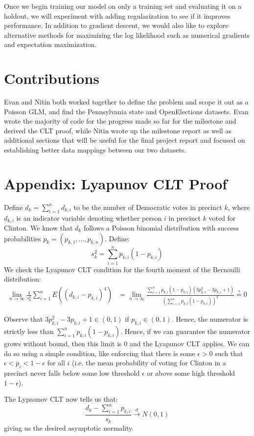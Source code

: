 \documentclass[10pt, letterpaper]{article}
\begin{document}
Once we begin training our model on only a training set and evaluating it on a holdout, we will experiment with adding regularization to see if it improves performance. In addition to gradient descent, we would also like to explore alternative methods for maximizing the log likelihood such as numerical gradients and expectation maximization.

\section{Contributions}
Evan and Nitin both worked together to define the problem and scope it out as a Poisson GLM, and find the Pennsylvania state and OpenElections datasets. Evan wrote the majority of code for the progress made so far for the milestone and derived the CLT proof, while Nitin wrote up the milestone report as well as additional sections that will be useful for the final project report and focused on establishing better data mappings between our two datasets.


\newpage
\section*{Appendix: Lyapunov CLT Proof}

Define $d_k = \sum_{i = 1}^n d_{k, i}$ to be the number of Democratic votes in precinct $k$, where $d_{k, i}$ is an indicator variable denoting whether person $i$ in precinct $k$ voted for Clinton. We know that $d_k$ follows a Poisson binomial distribution with success probabilities $p_k = (p_{k, 1}, \dots, p_{k, n})$. Define:
\[ s_{k}^2 = \sum_{i = 1}^{n} p_{k, i} (1-p_{k, i}) \] 
We check the Lyapunov CLT condition for the fourth moment of the Bernoulli distribution\cite{BernoulliDist}: 
\begin{align*}
\lim_{n \to \infty} \frac{1}{s_k^4} \sum_{i = 1}^n E \left( (d_{k, i} - p_{k, i})^4 \right) &= \lim_{n \to \infty} \frac{\sum_{i = 1}^n p_{k, i}(1-p_{k, i}) \left( 3p_{k, i}^2 - 3p_{k, i} + 1 \right)}{\left(\sum_{i = 1}^n p_{k, i} \left( 1- p_{k, i} \right) \right)^2} \stackrel{?} = 0 
\end{align*}

Observe that $3p_{k, i}^2 - 3p_{k, i} + 1 \in (0, 1)$ if $p_{k, i} \in (0, 1)$. Hence, the numerator is strictly less than $\sum_{i = 1}^n p_{k, i} (1 - p_{k, i})$. Hence, if we can guarantee the numerator grows without bound, then this limit is 0 and the Lyapunov CLT applies. We can do so using a simple condition, like enforcing that there is some $\epsilon > 0$ such that $\epsilon < \bar p_i < 1- \epsilon$ for all $i$ (i.e. the mean probability of voting for Clinton in a precinct never falls below some low threshold $\epsilon$ or above some high threshold $1-\epsilon$). 

The Lypaunov CLT now tells us that: 
\[ \frac{d_k - \sum_{i = 1}^{n} p_{k, i} }{s_k} \stackrel{d} \longrightarrow N(0, 1) \] 
giving us the desired asymptotic normality. 

{\small


}
\end{document}
